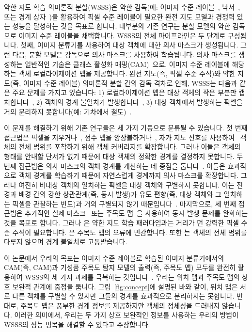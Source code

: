 \documentclass[final]{cvpr}
\begin{document}
약한 지도 학습 의미론적 분할(WSSS)은 약한 감독(예: 이미지 수준 레이블~\cite{pathak2015constrained, pinheiro2015image}, 낙서~\cite{lin2016scribblesup}, 또는 경계 상자~\cite{khoreva2017simple})을 활용하여 픽셀 수준 레이블이 필요한 완전 지도 모델과 경쟁력 있는 성능을 달성하는 것을 목표로 합니다. 대부분의 기존 연구는 분할 모델의 약한 감독으로 이미지 수준 레이블을 채택합니다. WSSS의 전체 파이프라인은 두 단계로 구성됩니다. 첫째, 이미지 분류기를 사용하여 대상 객체에 대한 의사 마스크가 생성됩니다. 그런 다음, 분할 모델은 감독으로 의사 마스크를 사용하여 학습됩니다. 의사 마스크를 생성하는 일반적인 기술은 클래스 활성화 매핑(CAM)~\cite{zhou2016learning}으로, 이미지 수준 레이블에 해당하는 객체 로컬라이제이션 맵을 제공합니다. 완전 지도(즉, 픽셀 수준 주석)와 약한 지도(즉, 이미지 수준 레이블) 의미론적 분할 간의 감독 격차로 인해, WSSS는 다음과 같은 주요 문제를 가지고 있습니다: 1) 로컬라이제이션 맵은 대상 객체의 작은 부분만 캡처합니다~\cite{zhou2016learning}, 2) 객체의 경계 불일치가 발생합니다~\cite{kim2017two}, 3) 대상 객체에서 발생하는 픽셀을 거의 분리하지 못합니다(예: 기차에서 철도)~\cite{kolesnikov2016seed}.



이 문제를 해결하기 위해 기존 연구들은 세 가지 기둥으로 분류될 수 있습니다. 첫 번째 접근법은 픽셀을 지우거나~\cite{choe2020attention,kim2017two, li2018tell}, 점수 맵을 앙상블하거나~\cite{jiang2019integral, lee2019ficklenet}, 자가 지도 신호를 사용하여~\cite{wang2020self} 객체의 전체 범위를 포착하기 위해 객체 커버리지를 확장합니다. 그러나 이들은 객체의 형태를 안내할 단서가 없기 때문에 대상 객체의 정확한 경계를 결정하지 못합니다. 두 번째 접근법은 의사 마스크의 객체 경계를 개선하는 데 중점을 둡니다~\cite{fan2020learning,chen2020boundary}. 이들은 효과적으로 객체 경계를 학습하기 때문에 자연스럽게 경계까지 의사 마스크를 확장합니다. 그러나 여전히 비대상 객체의 일치하는 픽셀을 대상 객체와 구별하지 못합니다. 이는 전경과 배경 간의 강한 상관관계(즉, 동시 발생)가 유도 편향(즉, 대상 객체와 그 일치하는 픽셀을 관찰하는 빈도)과 거의 구별되지 않기 때문입니다~\cite{choe2020evaluating}. 마지막으로, 세 번째 접근법은 추가적인 실제 마스크~\cite{BMVC2016_92} 또는 주목도 맵~\cite{oh2017exploiting, yao2020saliency}을 사용하여 동시 발생 문제를 완화하는 것을 목표로 합니다. 그러나 \cite{BMVC2016_92,li2018tell}은 약한 지도 학습 패러다임과는 거리가 먼 강력한 픽셀 수준 주석이 필요합니다. \cite{oh2017exploiting}은 주목도 맵의 오류에 민감합니다. 또한 \cite{yao2020saliency}는 객체의 전체 범위를 다루지 않으며 경계 불일치로 고통받습니다.

이 논문에서 우리의 목표는 이미지 수준 레이블로 학습된 이미지 분류기에서의 CAM(즉, CAM)과 기성품 주목도 탐지 모델의 출력(즉, 주목도 맵) 모두를 완전히 활용하여 WSSS의 세 가지 과제를 극복하는 것입니다~\cite{hou2017deeply,nguyen2019deepusps,zhao2019pyramid}. 우리는 위치 맵과 주목도 맵의 상호 보완적 관계에 중점을 둡니다. 그림~\ref{fig:concept}에 설명된 바와 같이, 위치 맵은 서로 다른 객체를 구별할 수 있지만 그들의 경계를 효과적으로 분리하지는 못합니다. 반대로, 주목도 맵은 풍부한 경계 정보를 제공하지만 객체의 정체성을 드러내지 않습니다. 이러한 의미에서, 우리는 두 가지 상호 보완적인 정보를 사용하는 우리의 방법이 WSSS의 성능 병목을 해결할 수 있다고 주장합니다.
\end{document}
